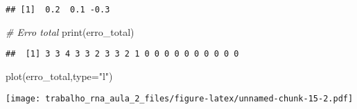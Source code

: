 \documentclass[
]{article}
\newenvironment{Shaded}{\begin{snugshade}}{\end{snugshade}}
\newcommand{\AttributeTok}[1]{\textcolor[rgb]{0.77,0.63,0.00}{#1}}
\newcommand{\CommentTok}[1]{\textcolor[rgb]{0.56,0.35,0.01}{\textit{#1}}}
\newcommand{\FunctionTok}[1]{\textcolor[rgb]{0.00,0.00,0.00}{#1}}
\newcommand{\NormalTok}[1]{#1}
\newcommand{\StringTok}[1]{\textcolor[rgb]{0.31,0.60,0.02}{#1}}
\begin{document}
\begin{verbatim}
## [1]  0.2  0.1 -0.3
\end{verbatim}

\begin{Shaded}
\begin{Highlighting}[]
\CommentTok{\# Erro total}
\FunctionTok{print}\NormalTok{(erro\_total)}
\end{Highlighting}
\end{Shaded}

\begin{verbatim}
##  [1] 3 3 4 3 3 2 3 3 2 1 0 0 0 0 0 0 0 0 0 0
\end{verbatim}

\begin{Shaded}
\begin{Highlighting}[]
\FunctionTok{plot}\NormalTok{(erro\_total,}\AttributeTok{type=}\StringTok{"l"}\NormalTok{)}
\end{Highlighting}
\end{Shaded}

\texttt{[image: trabalho\_rna\_aula\_2\_files/figure-latex/unnamed-chunk-15-2.pdf]}
\end{document}
